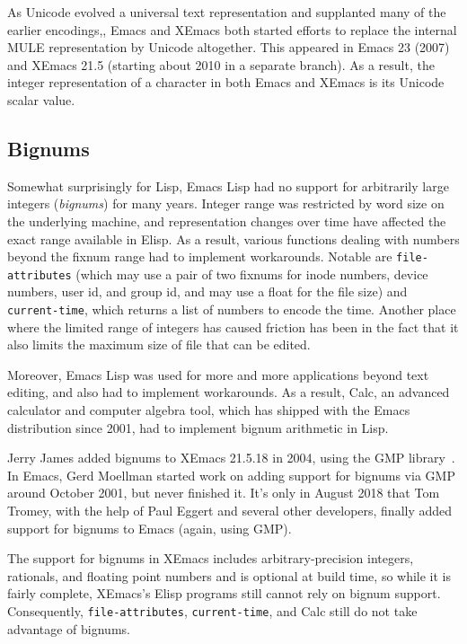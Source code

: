 \documentclass[format=acmsmall, review=false, screen=true]{acmart}
\newcommand \Elisp {Elisp}
\begin{document}
As Unicode evolved a universal text representation and supplanted many
of the earlier encodings,, Emacs and XEmacs both started efforts to
replace the internal MULE representation by Unicode altogether.  This
appeared in Emacs 23 (2007) and XEmacs 21.5 (starting about 2010 in a
separate branch).  As a result, the integer representation of a
character in both Emacs and XEmacs is its Unicode scalar value.

\subsection{Bignums}

Somewhat surprisingly for Lisp, Emacs Lisp had no support for
arbitrarily large integers (\emph{bignums}) for many years.
Integer range was restricted by word size on the underlying machine,
and representation changes over time have affected the exact range
available in \Elisp.
As a result, various functions dealing with numbers beyond the fixnum range
had to implement workarounds.  Notable are \texttt{file-attributes} (which
may use a pair of two fixnums for inode numbers, device numbers, user id,
and group id, and may use a float for the file size) and
\texttt{current-time}, which returns a list of numbers to encode the time.
Another place where the limited range of integers has caused friction has
been in the fact that it also limits the maximum size of file that can
be edited.

Moreover, Emacs Lisp was used for more and more applications beyond
text editing, and also had to implement workarounds.  As a result,
Calc, an advanced calculator and computer algebra tool, which has
shipped with the Emacs distribution since 2001, had to implement
bignum arithmetic in Lisp.

Jerry James added bignums to XEmacs 21.5.18 in 2004, using the GMP
library~\cite{GMP}.  In Emacs, Gerd Moellman started work on adding support
for bignums via GMP around October 2001, but never finished it.  It's only
in August 2018 that Tom Tromey, with the help of Paul Eggert and several
other developers, finally added support for bignums to Emacs (again, using
GMP).

The support for bignums in XEmacs includes arbitrary-precision integers,
rationals, and floating point numbers and is optional at build time, so
while it is fairly complete, XEmacs's \Elisp{} programs still cannot rely on
bignum support.  Consequently, \texttt{file-attributes},
\texttt{current-time}, and Calc still do not take advantage of bignums.
\end{document}
